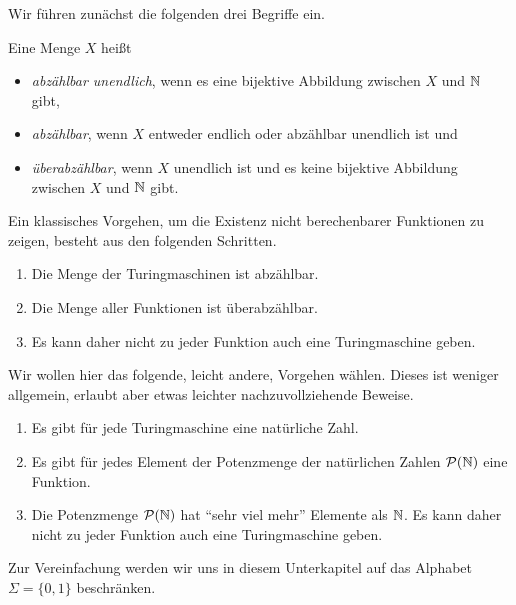 Wir führen zunächst die folgenden drei Begriffe ein.
\begin{Def}[name={[Abzählbar, Überabzählbar]}]
	Eine Menge $X$ heißt
	\begin{itemize}
		\item \emph{abzählbar unendlich}, wenn es eine bijektive Abbildung zwischen $X$ und $\mathbb{N}$ gibt,
		\item \emph{abzählbar}, wenn $X$ entweder endlich oder abzählbar unendlich ist und
		\item \emph{überabzählbar}, wenn $X$ unendlich ist und es keine bijektive Abbildung zwischen $X$ und $\mathbb{N}$ gibt.
		\qedhere
	\end{itemize}
\end{Def}

Ein klassisches Vorgehen, um die Existenz nicht berechenbarer Funktionen zu zeigen, besteht aus den folgenden Schritten.

\begin{enumerate}
	\item Die Menge der Turingmaschinen ist abzählbar.
	\item Die Menge aller Funktionen ist überabzählbar.
	\item Es kann daher nicht zu jeder Funktion auch eine Turingmaschine geben.
\end{enumerate}

Wir wollen hier das folgende, leicht andere, Vorgehen wählen.
Dieses ist weniger allgemein, erlaubt aber etwas leichter nachzuvollziehende Beweise.

\begin{enumerate}
	\item Es gibt für jede Turingmaschine eine natürliche Zahl.
	\item Es gibt für jedes Element der Potenzmenge der natürlichen Zahlen $\mathcal{P}(\mathbb{N})$ eine Funktion.
	\item Die Potenzmenge $\mathcal{P}(\mathbb{N})$ hat "`sehr viel mehr"' Elemente als $\mathbb{N}$.
	Es kann daher nicht zu jeder Funktion auch eine Turingmaschine geben.
\end{enumerate}


Zur Vereinfachung werden wir uns in diesem Unterkapitel auf das Alphabet $\Sigma=\{0,1\}$ beschränken.


